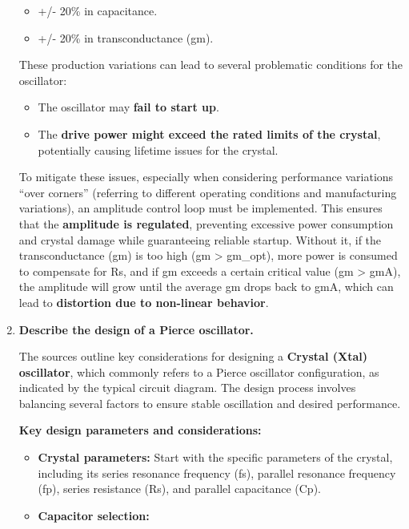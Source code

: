 \documentclass[
  a4paper,
]{article}
\providecommand{\tightlist}{%
  \setlength{\itemsep}{0pt}\setlength{\parskip}{0pt}}
\begin{document}
\begin{enumerate}
  \begin{itemize}
  \tightlist
  \item
    +/- 20\% in capacitance.
  \item
    +/- 20\% in transconductance (gm).
  \end{itemize}

  These production variations can lead to several problematic conditions
  for the oscillator:

  \begin{itemize}
  \tightlist
  \item
    The oscillator may \textbf{fail to start up}.
  \item
    The \textbf{drive power might exceed the rated limits of the
    crystal}, potentially causing lifetime issues for the crystal.
  \end{itemize}

  To mitigate these issues, especially when considering performance
  variations ``over corners'' (referring to different operating
  conditions and manufacturing variations), an amplitude control loop
  must be implemented. This ensures that the \textbf{amplitude is
  regulated}, preventing excessive power consumption and crystal damage
  while guaranteeing reliable startup. Without it, if the
  transconductance (gm) is too high (gm \textgreater{} gm\_opt), more
  power is consumed to compensate for Rs, and if gm exceeds a certain
  critical value (gm \textgreater{} gmA), the amplitude will grow until
  the average gm drops back to gmA, which can lead to \textbf{distortion
  due to non-linear behavior}.
\item
  \textbf{Describe the design of a Pierce oscillator.}

  The sources outline key considerations for designing a \textbf{Crystal
  (Xtal) oscillator}, which commonly refers to a Pierce oscillator
  configuration, as indicated by the typical circuit diagram. The design
  process involves balancing several factors to ensure stable
  oscillation and desired performance.

  \textbf{Key design parameters and considerations:}

  \begin{itemize}
  \tightlist
  \item
    \textbf{Crystal parameters:} Start with the specific parameters of
    the crystal, including its series resonance frequency (fs), parallel
    resonance frequency (fp), series resistance (Rs), and parallel
    capacitance (Cp).
  \item
    \textbf{Capacitor selection:}


\end{itemize}
\end{enumerate}
\end{document}
